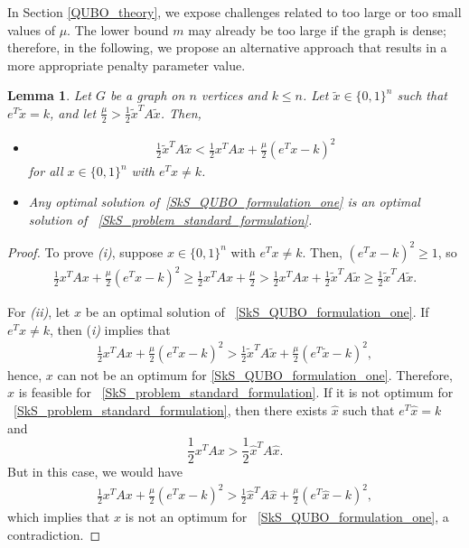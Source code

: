 \documentclass{article}
\newtheorem{lem}[thm]{Lemma}
\begin{document}
In Section \ref{QUBO_theory}, we expose challenges related to too large or too small values of $\mu$. The lower bound $m$ may already be too large if the graph is dense; therefore, in the following, we propose an alternative approach that results in a more appropriate penalty parameter value.

\begin{lem}\label{penalty_feasible_solution} 
Let $G$ be a graph on $n$ vertices and $k \leq n$. Let $\tilde{x} \in \{0, 1\}^n$ such that $e^T\tilde{x} = k$, and let $\frac{\mu}{2} > \frac{1}{2} \tilde{x}^TA\tilde{x}$. Then,
\begin{itemize}
    \item [(i)]
\begin{align*}
\frac{1}{2} \tilde{x}^TA\tilde{x} < \frac{1}{2} x^T A x + \frac{\mu}{2}(e^Tx - k)^2
\end{align*}
for all $x \in \{0, 1\}^n$ with $e^Tx \neq k$.
\item[(ii)] Any  optimal solution of~\eqref{SkS_QUBO_formulation_one} is an optimal solution of ~\eqref{SkS_problem_standard_formulation}.
\end{itemize}
\end{lem}

\begin{proof}
To prove {\it (i)}, suppose  $x \in \{0, 1\}^n$ with $e^Tx \neq k$. Then, $(e^Tx - k)^2 \geq 1$, so
\begin{align*}
\frac{1}{2} x^T A x + \frac{\mu}{2}(e^Tx - k)^2 \geq \frac{1}{2} x^T A x + \frac{\mu}{2} > \frac{1}{2} x^T A x + \frac{1}{2} \tilde{x}^TA\tilde{x} \geq \frac{1}{2} \tilde{x}^TA\tilde{x}.
\end{align*}

For {\it (ii)}, let $x$ be an optimal solution of ~\eqref{SkS_QUBO_formulation_one}.
If  $e^Tx\neq k$, then {(\it i)} implies that 
\begin{align*}
\frac{1}{2} x^T A x + \frac{\mu}{2}(e^Tx - k)^2 > \frac{1}{2} \tilde{x}^TA\tilde{x}+
\frac{\mu}{2}(e^T \tilde x - k)^2,
\end{align*}
hence, $x$ can not be an optimum for 
\eqref{SkS_QUBO_formulation_one}.
Therefore, $x$ is feasible for ~\eqref{SkS_problem_standard_formulation}. If it is not optimum for  ~\eqref{SkS_problem_standard_formulation}, then there exists $\hat x$ such that $e^T\hat x=k$ and 
$$\frac{1}{2} x^T A x > \frac{1}{2} \hat x^T A \hat x.$$ 
But in this case, we would have 
\begin{align*}
\frac{1}{2} x^T A x + \frac{\mu}{2}(e^Tx - k)^2 > 
\frac{1}{2} \hat x^T A \hat x + \frac{\mu}{2}(e^T\hat x - k)^2,
\end{align*}
which implies that  $x$ is not an optimum for   ~\eqref{SkS_QUBO_formulation_one}, a contradiction.
\end{proof}
\end{document}
